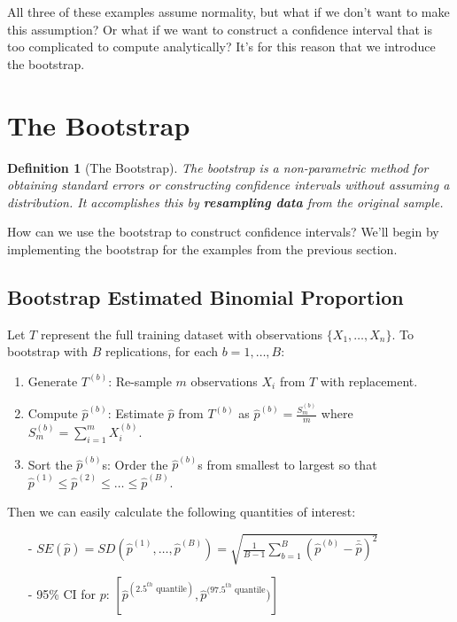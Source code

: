 \documentclass[twoside]{article}
\newtheorem{definition}[theorem]{Definition}
\theoremstyle{definition}
\begin{document}
All three of these examples assume normality, but what if we don't want to make this assumption? Or what if we want to construct a confidence interval that is too complicated to compute analytically? It's for this reason that we introduce the bootstrap.

\section{The Bootstrap}

\begin{definition}[The Bootstrap]
    The bootstrap is a non-parametric method for obtaining standard errors or constructing confidence intervals without assuming a distribution. It accomplishes this by \textbf{resampling data} from the original sample.
\end{definition}
How can we use the bootstrap to construct confidence intervals? We'll begin by implementing the bootstrap for the examples from the previous section.

\subsection{Bootstrap Estimated Binomial Proportion}

Let $T$ represent the full training dataset with observations $\{X_1, \ldots, X_n\}$. To bootstrap with $B$ replications, for each $b = 1, \ldots, B$:
\begin{enumerate}
    \item Generate $T^{(b)}$: Re-sample $m$ observations $X_i$ from $T$ with replacement.
    \item Compute $\widehat{p}^{(b)}$: Estimate $\widehat{p}$ from $T^{(b)}$ as $\widehat{p}^{(b)} = \frac{S_m^{(b)}}{m}$ where $S_m^{(b)} = \sum_{i=1}^m X_i^{(b)}$.
    \item Sort the $\widehat{p}^{(b)}$s: Order the $\widehat{p}^{(b)}$s from smallest to largest so that $\widehat{p}^{(1)} \leq \widehat{p}^{(2)} \leq \ldots \leq \widehat{p}^{(B)}$.
\end{enumerate}
Then we can easily calculate the following quantities of interest:
\begin{itemize}
    \item[-] $SE(\widehat{p}) = SD(\widehat{p}^{(1)}, \ldots, \widehat{p}^{(B)}) = \sqrt{\frac{1}{B - 1} \sum_{b=1}^B \left(\widehat{p}^{(b)} - \bar{\widehat{p}}\right)^2}$
    \item[-] 95\% CI for $p$: $[\widehat{p}^{(2.5^{th} \text{ quantile})}, \widehat{p}^{(97.5^{th} \text{ quantile}})]$
\end{itemize}
\end{document}
